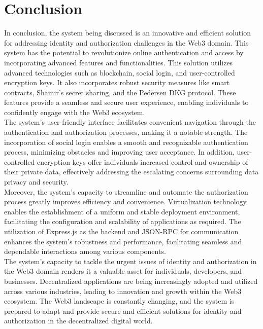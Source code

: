 \documentclass[../Main.tex]{subfiles}
\begin{document}
\section{Conclusion}
\label{section:6.1}
In conclusion, the system being discussed is an innovative and efficient solution for addressing identity and authorization challenges in the Web3 domain. This system has the potential to revolutionize online authentication and access by incorporating advanced features and functionalities. This solution utilizes advanced technologies such as blockchain, social login, and user-controlled encryption keys. It also incorporates robust security measures like smart contracts, Shamir's secret sharing, and the Pedersen DKG protocol. These features provide a seamless and secure user experience, enabling individuals to confidently engage with the Web3 ecosystem.\\
\indent The system's user-friendly interface facilitates convenient navigation through the authentication and authorization processes, making it a notable strength. The incorporation of social login enables a smooth and recognizable authentication process, minimizing obstacles and improving user acceptance. In addition, user-controlled encryption keys offer individuals increased control and ownership of their private data, effectively addressing the escalating concerns surrounding data privacy and security.\\
\indent Moreover, the system's capacity to streamline and automate the authorization process greatly improves efficiency and convenience. Virtualization technology enables the establishment of a uniform and stable deployment environment, facilitating the configuration and scalability of applications as required. The utilization of Express.js as the backend and JSON-RPC for communication enhances the system's robustness and performance, facilitating seamless and dependable interactions among various components.\\
\indent The system's capacity to tackle the urgent issues of identity and authorization in the Web3 domain renders it a valuable asset for individuals, developers, and businesses. Decentralized applications are being increasingly adopted and utilized across various industries, leading to innovation and growth within the Web3 ecosystem. The Web3 landscape is constantly changing, and the system is prepared to adapt and provide secure and efficient solutions for identity and authorization in the decentralized digital world.\\
\end{document}
